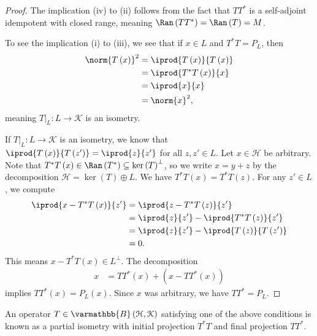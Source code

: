 \documentclass[10pt]{mypackage}
\renewcommand*{\mathbb}[1]{\varmathbb{#1}}
\newcommand{\B}{\mathbb{B}}
\begin{document}
\begin{proof}
  The implication (iv) to (ii) follows from the fact that $TT^{\ast}$ is a self-adjoint idempotent with closed range, meaning $\Ran\left(TT^{\ast}\right) = \Ran\left(T\right) = M$.\newline

  To see the implication (i) to (iii), we see that if $x\in L$ and $T^{\ast}T = P_{L}$, then
  \begin{align*}
    \norm{T\left(x\right)}^2 &= \iprod{T\left(x\right)}{T\left(x\right)}\\
                             &= \iprod{T^{\ast}T\left(x\right)}{x}\\
                             &= \iprod{x}{x}\\
                             &= \norm{x}^2,
  \end{align*}
  meaning $T|_{L}:L\rightarrow\mathcal{K}$ is an isometry.\newline

  If $T|_{L}:L\rightarrow \mathcal{K}$ is an isometry, we know that $ \iprod{T\left(x\right)}{T\left(z'\right)} = \iprod{z}{z'} $ for all $z,z'\in L$. Let $x\in \mathcal{H}$ be arbitrary. Note that $T^{\ast}T\left(x\right)\in \Ran\left(T^{\ast}\right)\subseteq \ker\left(T\right)^{\perp}$, so we write $x = y +z$ by the decomposition $\mathcal{H} = \ker\left(T\right) \oplus L$. We have $T^{\ast}T\left(x\right) = T^{\ast}T\left(z\right)$. For any $z'\in L$, we compute
  \begin{align*}
    \iprod{x - T^{\ast}T\left(x\right)}{z'} &= \iprod{z - T^{\ast}T\left(z\right)}{z'}\\
                                            &= \iprod{z}{z'} - \iprod{T^{\ast}T\left(z\right)}{z'}\\
                                            &= \iprod{z}{z'} - \iprod{T\left(z\right)}{T\left(z'\right)}\\
                                            &= 0.
  \end{align*}
  This means $x-T^{\ast}T\left(x\right) \in L^{\perp}$. The decomposition
  \begin{align*}
    x &= TT^{\ast}\left(x\right) + \left(x - TT^{\ast}\left(x\right)\right)
  \end{align*}
  implies $TT^{\ast}\left(x\right) = P_{L}\left(x\right)$. Since $x$ was arbitrary, we have $TT^{\ast} = P_{L}$.
\end{proof}
\begin{definition}
  An operator $T\in \B\left(\mathcal{H},\mathcal{K}\right)$ satisfying one of the above conditions is known as a partial isometry with initial projection $T^{\ast}T$ and final projection $TT^{\ast}$.
\end{definition}
\end{document}

